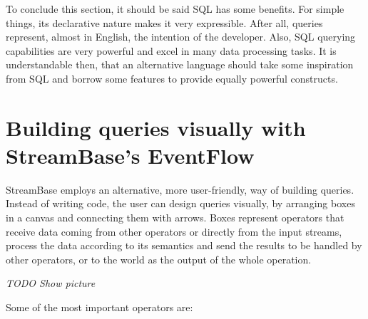 \documentclass{report}
\begin{document}
To conclude this section, it should be said SQL has some benefits. For
simple things, its declarative nature makes it very expressible. After
all, queries represent, almost in English, the intention of the
developer. Also, SQL querying capabilities are very powerful and excel
in many data processing tasks. It is understandable then, that an
alternative language should take some inspiration from SQL and borrow
some features to provide equally powerful constructs.

\section{Building queries visually with StreamBase's EventFlow}

StreamBase employs an alternative, more user-friendly, way of building
queries. Instead of writing code, the user can design queries
visually, by arranging boxes in a canvas and connecting them with
arrows. Boxes represent operators that receive data coming from other
operators or directly from the input streams, process the data
according to its semantics and send the results to be handled by other
operators, or to the world as the output of the whole operation.

\emph{TODO Show picture}

Some of the most important operators are:
\end{document}
